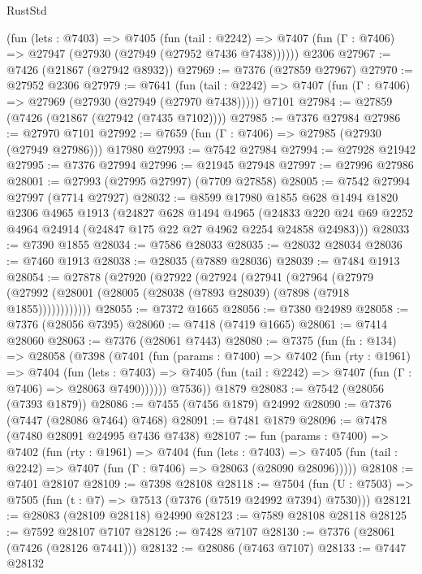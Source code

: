 \begin{lexlean}{RustStd}
\begin{coremodule}
    (fun (lets : @7403) =>
    @7405
      (fun (tail : @2242) =>
      @7407 (fun (Γ : @7406) => @27947 (@27930 (@27949 (@27952 @7436 @7438))))))
    @2306
@27967 := @7426 (@21867 (@27942 @8932))
@27969 := @7376 (@27859 @27967)
@27970 := @27952 @2306
@27979 := @7641
    (fun (tail : @2242) => @7407 (fun (Γ : @7406) => @27969 (@27930 (@27949 (@27970 @7438)))))
    @7101
@27984 := @27859 (@7426 (@21867 (@27942 (@7435 @7102))))
@27985 := @7376 @27984
@27986 := @27970 @7101
@27992 := @7659 (fun (Γ : @7406) => @27985 (@27930 (@27949 @27986))) @17980
@27993 := @7542 @27984
@27994 := @27928 @21942
@27995 := @7376 @27994
@27996 := @21945 @27948
@27997 := @27996 @27986
@28001 := @27993 (@27995 @27997) (@7709 @27858)
@28005 := @7542 @27994 @27997 (@7714 @27927)
@28032 := @8599
    @17980
    @1855
    @628
    @1494
    @1820
    @2306
    @4965
    @1913
    (@24827
      @628
      @1494
      @4965
      (@24833 @220 @24 @69 @2252 @4964 @24914 (@24847 @175 @22 @27 @4962 @2254 @24858 @24983)))
@28033 := @7390 @1855
@28034 := @7586 @28033
@28035 := @28032 @28034
@28036 := @7460 @1913
@28038 := @28035 (@7889 @28036)
@28039 := @7484 @1913
@28054 := @27878
    (@27920
      (@27922
        (@27924
          (@27941
            (@27964
              (@27979 (@27992 (@28001 (@28005 (@28038 (@7893 @28039) (@7898 (@7918 @1855))))))))))))
@28055 := @7372 @1665
@28056 := @7380 @24989
@28058 := @7376 (@28056 @7395)
@28060 := @7418 (@7419 @1665)
@28061 := @7414 @28060
@28063 := @7376 (@28061 @7443)
@28080 := @7375
    (fun (fn : @134) =>
    @28058
      (@7398
        (@7401
          (fun (params : @7400) =>
          @7402
            (fun (rty : @1961) =>
            @7404
              (fun (lets : @7403) =>
              @7405 (fun (tail : @2242) => @7407 (fun (Γ : @7406) => @28063 @7490))))))
        @7536))
    @1879
@28083 := @7542 (@28056 (@7393 @1879))
@28086 := @7455 (@7456 @1879) @24992
@28090 := @7376 (@7447 (@28086 @7464) @7468)
@28091 := @7481 @1879
@28096 := @7478 (@7480 @28091 @24995 @7436 @7438)
@28107 := fun (params : @7400) =>
  @7402
    (fun (rty : @1961) =>
    @7404
      (fun (lets : @7403) =>
      @7405 (fun (tail : @2242) => @7407 (fun (Γ : @7406) => @28063 (@28090 @28096)))))
@28108 := @7401 @28107
@28109 := @7398 @28108
@28118 := @7504
    (fun (U : @7503) => @7505 (fun (t : @7) => @7513 (@7376 (@7519 @24992 @7394) @7530)))
@28121 := @28083 (@28109 @28118) @24990
@28123 := @7589 @28108 @28118
@28125 := @7592 @28107 @7107
@28126 := @7428 @7107
@28130 := @7376 (@28061 (@7426 (@28126 @7441)))
@28132 := @28086 (@7463 @7107)
@28133 := @7447 @28132

\end{coremodule}
\end{lexlean}

